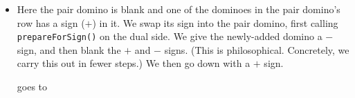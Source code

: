 \documentclass[12pt]{article}
\numberwithin{equation}{section}
\newcommand{\horizontalDominoRSShift}[4]{\filldraw [dominoRSStyle] (#2 - 1 + #4 + \eps, #1 - 1 + \eps) rectangle + (2 - \teps, 1 -\teps) node [dominoText] {$#3$};}
\newcommand{\verticalDominoRSShift}[4]{\filldraw [dominoRSStyle] (#2 - 1 + #4 + \eps,  #1 - 1 + \eps) rectangle + (1 - \teps,2 -\teps) node [dominoText] {$#3$};}
\begin{document}
\begin{itemize}
\begin{itemize}
\begin{figure}[H]
      \end{figure}

      \item Here the pair domino is blank and one of the dominoes in the pair domino's row has a sign ($+$) in it.
      We swap its sign into the pair domino, first calling \texttt{prepareForSign()} on the dual side.
      We give the newly-added domino a $-$ sign, and then blank the $+$ and $-$ signs.
      (This is philosophical.  Concretely, we carry this out in fewer steps.)
      We then go down with a $+$ sign.
      \begin{figure}[H]
        \centering
      \end{figure}
      goes to
      \begin{figure}[H]
        \centering
\end{figure}
\end{itemize}
\end{itemize}
\end{document}

